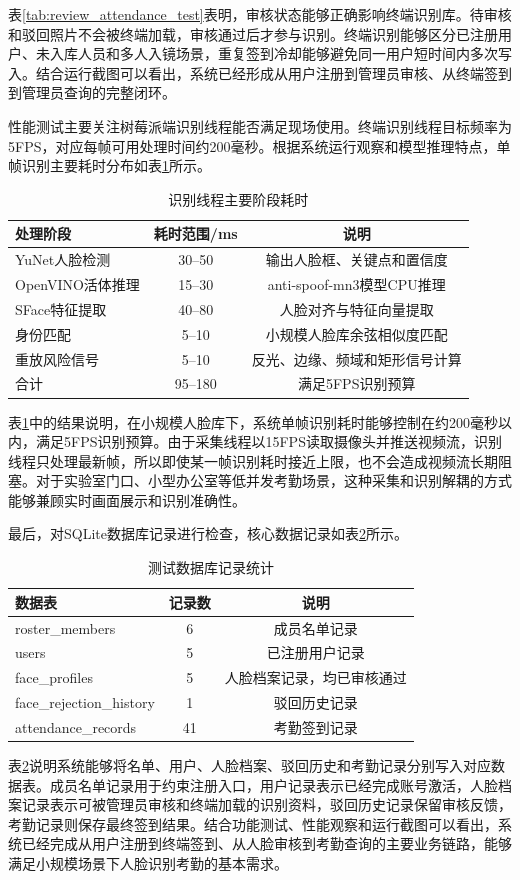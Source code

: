 表\ref{tab:review_attendance_test}表明，审核状态能够正确影响终端识别库。待审核和驳回照片不会被终端加载，审核通过后才参与识别。终端识别能够区分已注册用户、未入库人员和多人入镜场景，重复签到冷却能够避免同一用户短时间内多次写入。结合运行截图可以看出，系统已经形成从用户注册到管理员审核、从终端签到到管理员查询的完整闭环。

性能测试主要关注树莓派端识别线程能否满足现场使用。终端识别线程目标频率为5FPS，对应每帧可用处理时间约200毫秒。根据系统运行观察和模型推理特点，单帧识别主要耗时分布如表\ref{tab:perf_time}所示。

\begin{table}[H]
    \centering
    \caption{识别线程主要阶段耗时}
    \label{tab:perf_time}
    \begin{tabular}{lcc}
        \toprule
        \textbf{处理阶段} & \textbf{耗时范围/ms} & \textbf{说明} \\
        \midrule
        YuNet人脸检测 & 30--50 & 输出人脸框、关键点和置信度 \\
        OpenVINO活体推理 & 15--30 & anti-spoof-mn3模型CPU推理 \\
        SFace特征提取 & 40--80 & 人脸对齐与特征向量提取 \\
        身份匹配 & 5--10 & 小规模人脸库余弦相似度匹配 \\
        重放风险信号 & 5--10 & 反光、边缘、频域和矩形信号计算 \\
        \midrule
        合计 & 95--180 & 满足5FPS识别预算 \\
        \bottomrule
    \end{tabular}
\end{table}

表\ref{tab:perf_time}中的结果说明，在小规模人脸库下，系统单帧识别耗时能够控制在约200毫秒以内，满足5FPS识别预算。由于采集线程以15FPS读取摄像头并推送视频流，识别线程只处理最新帧，所以即使某一帧识别耗时接近上限，也不会造成视频流长期阻塞。对于实验室门口、小型办公室等低并发考勤场景，这种采集和识别解耦的方式能够兼顾实时画面展示和识别准确性。

最后，对SQLite数据库记录进行检查，核心数据记录如表\ref{tab:db_test}所示。

\begin{table}[H]
    \centering
    \caption{测试数据库记录统计}
    \label{tab:db_test}
    \begin{tabular}{lcc}
        \toprule
        \textbf{数据表} & \textbf{记录数} & \textbf{说明} \\
        \midrule
        roster\_members & 6 & 成员名单记录 \\
        users & 5 & 已注册用户记录 \\
        face\_profiles & 5 & 人脸档案记录，均已审核通过 \\
        face\_rejection\_history & 1 & 驳回历史记录 \\
        attendance\_records & 41 & 考勤签到记录 \\
        \bottomrule
    \end{tabular}
\end{table}

表\ref{tab:db_test}说明系统能够将名单、用户、人脸档案、驳回历史和考勤记录分别写入对应数据表。成员名单记录用于约束注册入口，用户记录表示已经完成账号激活，人脸档案记录表示可被管理员审核和终端加载的识别资料，驳回历史记录保留审核反馈，考勤记录则保存最终签到结果。结合功能测试、性能观察和运行截图可以看出，系统已经完成从用户注册到终端签到、从人脸审核到考勤查询的主要业务链路，能够满足小规模场景下人脸识别考勤的基本需求。

